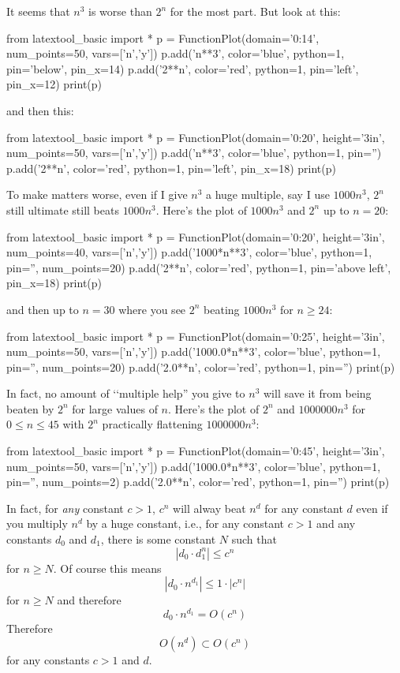 It seems that $n^3$ is worse than $2^n$ for the most part.
But look at this:
\begin{python}
from latextool_basic import *
p = FunctionPlot(domain='0:14', num_points=50, vars=['n','y'])
p.add('n**3', color='blue', python=1, pin='below', pin_x=14)
p.add('2**n', color='red', python=1, pin='left', pin_x=12)
print(p)
\end{python}
and then this:
\begin{python}
from latextool_basic import *
p = FunctionPlot(domain='0:20', height='3in', num_points=50, vars=['n','y'])
p.add('n**3', color='blue', python=1, pin='')
p.add('2**n', color='red', python=1, pin='left', pin_x=18)
print(p)
\end{python}
To make matters worse, even if I give $n^3$ a huge multiple,
say I use $1000n^3$, $2^n$ still ultimate still beats $1000n^3$.
Here's the plot of $1000n^3$ and $2^n$ up to $n = 20$:
\begin{python}
from latextool_basic import *
p = FunctionPlot(domain='0:20', height='3in', num_points=40, vars=['n','y'])
p.add('1000*n**3', color='blue', python=1, pin='', num_points=20)
p.add('2**n', color='red', python=1, pin='above left', pin_x=18)
print(p)
\end{python}
and then up to $n = 30$ where you see $2^n$ beating
$1000n^3$ for $n \geq 24$:
\begin{python}
from latextool_basic import *
p = FunctionPlot(domain='0:25', height='3in', num_points=50, vars=['n','y'])
p.add('1000.0*n**3', color='blue', python=1, pin='', num_points=20)
p.add('2.0**n', color='red', python=1, pin='')
print(p)
\end{python}
In fact, no amount of \lq\lq multiple help'' you give to $n^3$
will save it from being beaten by $2^n$ for large values of
$n$.
Here's the plot of $2^n$ and $1000000n^3$ for $0 \leq n \leq 45$
with $2^n$ practically flattening $1000000n^3$:
\begin{python}
from latextool_basic import *
p = FunctionPlot(domain='0:45', height='3in', num_points=50, vars=['n','y'])
p.add('1000.0*n**3', color='blue', python=1, pin='', num_points=2)
p.add('2.0**n', color='red', python=1, pin='')
print(p)
\end{python}
In fact, for \textit{any} constant $c > 1$, $c^n$ will alway
beat $n^d$ for any constant $d$ even if you multiply $n^d$
by a huge constant, i.e., 
for any constant $c > 1$ and any constants $d_0$ and $d_1$,
there is some constant $N$ such that
\[
|d_0 \cdot d_1^n| \leq c^n
\]
for $n \geq N$.
Of course this means
\[
|d_0 \cdot n^{d_1}| \leq 1 \cdot |c^n|
\]
for $n \geq N$ and therefore
\[
d_0 \cdot n^{d_1} = O(c^n)
\]
Therefore
\[
O(n^d) \subset O(c^n)
\]
for any constants $c > 1$ and $d$.


